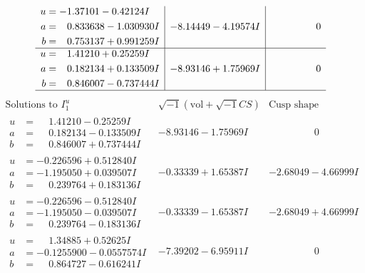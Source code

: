 \documentclass[1p]{elsarticle_modified}
\theoremstyle{definition}
\newcommand{\I}{\sqrt{-1}}
\begin{document}
$$\begin{array}{c|c|c}
\begin{aligned}
u &= -1.37101 - 0.42124 I \\
a &= \phantom{-}0.833638 - 1.030930 I \\
b &= \phantom{-}0.753137 + 0.991259 I\end{aligned}
 & -8.14449 - 4.19574 I & \phantom{-0.000000 } 0 \\ \hline\begin{aligned}
u &= \phantom{-}1.41210 + 0.25259 I \\
a &= \phantom{-}0.182134 + 0.133509 I \\
b &= \phantom{-}0.846007 - 0.737444 I\end{aligned}
 & -8.93146 + 1.75969 I & \phantom{-0.000000 } 0\\
 \hline 
 \end{array}$$\newpage$$\begin{array}{c|c|c}  
\text{Solutions to }I^u_{1}& \I (\text{vol} + \sqrt{-1}CS) & \text{Cusp shape}\\
 \hline 
\begin{aligned}
u &= \phantom{-}1.41210 - 0.25259 I \\
a &= \phantom{-}0.182134 - 0.133509 I \\
b &= \phantom{-}0.846007 + 0.737444 I\end{aligned}
 & -8.93146 - 1.75969 I & \phantom{-0.000000 } 0 \\ \hline\begin{aligned}
u &= -0.226596 + 0.512840 I \\
a &= -1.195050 + 0.039507 I \\
b &= \phantom{-}0.239764 + 0.183136 I\end{aligned}
 & -0.33339 + 1.65387 I & -2.68049 - 4.66999 I \\ \hline\begin{aligned}
u &= -0.226596 - 0.512840 I \\
a &= -1.195050 - 0.039507 I \\
b &= \phantom{-}0.239764 - 0.183136 I\end{aligned}
 & -0.33339 - 1.65387 I & -2.68049 + 4.66999 I \\ \hline\begin{aligned}
u &= \phantom{-}1.34885 + 0.52625 I \\
a &= -0.1255900 - 0.0557574 I \\
b &= \phantom{-}0.864727 - 0.616241 I\end{aligned}
 & -7.39202 - 6.95911 I & \phantom{-0.000000 } 0 \\ \hline\begin{aligned}

\end{aligned}
\end{array}$$
\end{document}
